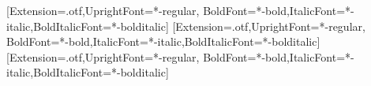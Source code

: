%

\usepackage{fontspec}
\usepackage{polyglossia}
\setmainlanguage{romanian}   %
\usepackage{tikz}
\usepackage[most]{tcolorbox}
\usepackage{fontawesome5}
\usepackage{booktabs}
\usepackage{array}
\usepackage{ragged2e}
\usetikzlibrary{positioning,calc,arrows.meta,decorations.pathreplacing}


\setsansfont{texgyreheros}[Extension=.otf,UprightFont=*-regular,
  BoldFont=*-bold,ItalicFont=*-italic,BoldItalicFont=*-bolditalic]
\setmainfont{texgyreheros}[Extension=.otf,UprightFont=*-regular,
  BoldFont=*-bold,ItalicFont=*-italic,BoldItalicFont=*-bolditalic]
\newfontfamily{}[Extension=.otf,UprightFont=*-regular,
  BoldFont=*-bold,ItalicFont=*-italic,BoldItalicFont=*-bolditalic]
